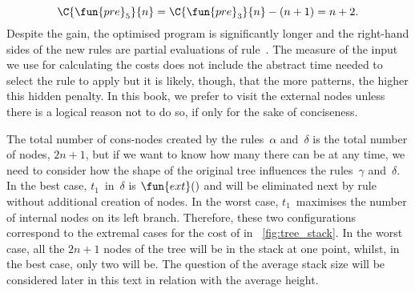 \begin{equation*}
\C{\fun{pre}_5}{n} = \C{\fun{pre}_3}{n} - (n+1) = n + 2.
\end{equation*}
Despite the gain, the optimised program is significantly longer and
the right\hyp{}hand sides of the new rules are partial
evaluations of
rule~\clause{\delta}. The measure of the input we use for calculating
the costs does not include the abstract time needed to select the rule
to apply but it is likely, though, that the more patterns, the higher
this hidden penalty. In this book, we prefer to visit the external
nodes unless there is a logical reason not to do so, if only for the
sake of conciseness.

The total number of cons\hyp{}nodes created by the
rules~\(\alpha\) and~\(\delta\) is the total number of nodes,
\(2n+1\), but if we want to know how many there can be at any time, we
need to consider how the shape of the original tree influences the
rules~\(\gamma\) and~\(\delta\). In the best case,
\(t_1\)~in~\(\delta\) is \(\fun{ext}()\) and will be eliminated next
by rule~\clause{\gamma} without additional creation of nodes. In the
worst case, \(t_1\)~maximises the number of internal nodes on its left
branch. Therefore, these two configurations correspond to the extremal
cases for the cost of 
in \fig~\vref{fig:tree_stack}. In the worst case, all the \(2n+1\)
nodes of the tree will be in the stack at one point, whilst, in the
best case, only two will be. The question of the average stack size
will be considered later in this text in relation with the average
height.

